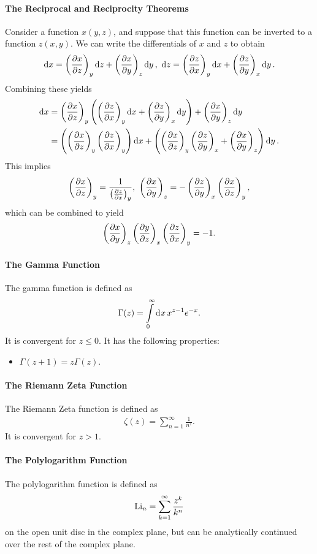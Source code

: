 \paragraph{The Reciprocal and Reciprocity Theorems}
Consider a function $x(y, z)$, and suppose that this function can be inverted to a function $z(x, y)$. We can write the differentials of $x$ and $z$ to obtain
\begin{align*}
	\dd{x} = \fix{\pdv{x}{z}}{y}\dd{z} + \fix{\pdv{x}{y}}{z}\dd{y},\ \dd{z} = \fix{\pdv{z}{x}}{y}\dd{x} + \fix{\pdv{z}{y}}{x}\dd{y}.
\end{align*}
Combining these yields
\begin{align*}
	\dd{x} &= \left(\pdv{x}{z}\right)_{y}\left(\left(\pdv{z}{x}\right)_{y}\dd{x} + \left(\pdv{z}{y}\right)_{x}\dd{y}\right) + \left(\pdv{x}{y}\right)_{z}\dd{y} \\
	       &= \left(\left(\pdv{x}{z}\right)_{y}\left(\pdv{z}{x}\right)_{y}\right)\dd{x} + \left(\left(\pdv{x}{z}\right)_{y}\left(\pdv{z}{y}\right)_{x} + \left(\pdv{x}{y}\right)_{z}\right)\dd{y}.
\end{align*}
This implies
\begin{align*}
	\fix{\pdv{x}{z}}{y} = \frac{1}{\fix{\pdv{z}{x}}{y}},\ \fix{\pdv{x}{y}}{z} = -\fix{\pdv{z}{y}}{x}\fix{\pdv{x}{z}}{y},
\end{align*}
which can be combined to yield
\begin{align*}
	 \left(\pdv{x}{y}\right)_{z}\left(\pdv{y}{z}\right)_{x}\left(\pdv{z}{x}\right)_{y} = -1.
\end{align*}

\paragraph{The Gamma Function}
The gamma function is defined as
\begin{align*}
	\Gamma(z) = \int\limits_{0}^{\infty}\dd[]{x}x^{z - 1}e^{-x}.
\end{align*}
It is convergent for $z \leq 0$. It has the following properties:
\begin{itemize}
	\item $\Gamma(z + 1) = z\Gamma(z)$.
\end{itemize}

\paragraph{The Riemann Zeta Function}
The Riemann Zeta function is defined as
\begin{align*}
	\zeta(z) = \sum\limits_{n = 1}^{\infty}\frac{1}{n^{z}}.
\end{align*}
It is convergent for $z > 1$.

\paragraph{The Polylogarithm Function}
The polylogarithm function is defined as
\begin{align*}
	\text{Li}_{n} = \sum\limits_{k = 1}^{\infty}\frac{z^{k}}{k^{n}}
\end{align*}
on the open unit disc in the complex plane, but can be analytically continued over the rest of the complex plane.